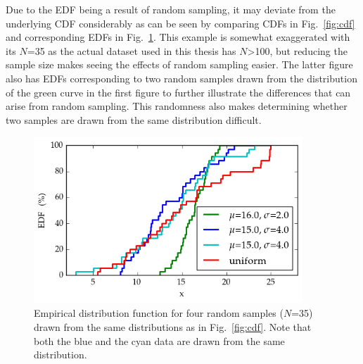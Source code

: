 \documentclass[english, oneside]{HYgradu}
\begin{document}
Due to the EDF being a result of random sampling, it may deviate from the underlying CDF considerably as can be seen by comparing CDFs in Fig.\ \ref{fig:cdf} and corresponding EDFs in Fig.\ \ref{fig:edf}. This example is somewhat exaggerated with its $N$=35 as the actual dataset used in this thesis has $N$>100, but reducing the sample size makes seeing the effects of random sampling easier. The latter figure also has EDFs corresponding to two random samples drawn from the distribution of the green curve in the first figure to further illustrate the differences that can arise from random sampling. This randomness also makes determining whether two samples are drawn from the same distribution difficult.

\begin{figure}
   \centering
   \includegraphics[width=0.9\textwidth]{kuvat/edf.png}
   \caption{Empirical distribution function for four random samples ($N$=35) drawn from the same distributions as in Fig.\ \ref{fig:cdf}. Note that both the blue and the cyan data are drawn from the same distribution.}
   \label{fig:edf}
\end{figure}
\end{document}

